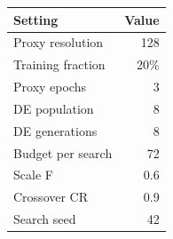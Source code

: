 \begin{tabular}{lr}
\toprule
Setting & Value \\
\midrule
Proxy resolution & 128 \\
Training fraction & 20\% \\
Proxy epochs & 3 \\
DE population & 8 \\
DE generations & 8 \\
Budget per search & 72 \\
Scale F & 0.6 \\
Crossover CR & 0.9 \\
Search seed & 42 \\
\bottomrule
\end{tabular}
